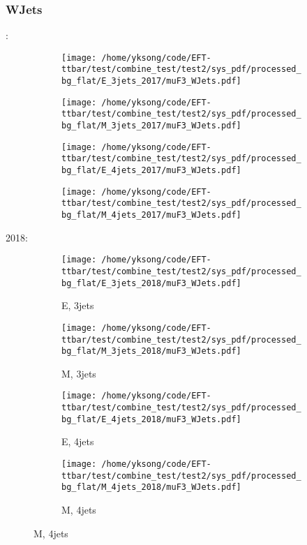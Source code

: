 \documentclass{beamer}
\begin{document}
\begin{frame}
\frametitle{WJets}
\fontsize{5}{1}:
\begin{figure}
\centering
\begin{subfigure}[b]{0.24\textwidth}
\texttt{[image: /home/yksong/code/EFT-ttbar/test/combine\_test/test2/sys\_pdf/processed\_bg\_flat/E\_3jets\_2017/muF3\_WJets.pdf]}
\end{subfigure}
\begin{subfigure}[b]{0.24\textwidth}
\texttt{[image: /home/yksong/code/EFT-ttbar/test/combine\_test/test2/sys\_pdf/processed\_bg\_flat/M\_3jets\_2017/muF3\_WJets.pdf]}
\end{subfigure}
\begin{subfigure}[b]{0.24\textwidth}
\texttt{[image: /home/yksong/code/EFT-ttbar/test/combine\_test/test2/sys\_pdf/processed\_bg\_flat/E\_4jets\_2017/muF3\_WJets.pdf]}
\end{subfigure}
\begin{subfigure}[b]{0.24\textwidth}
\texttt{[image: /home/yksong/code/EFT-ttbar/test/combine\_test/test2/sys\_pdf/processed\_bg\_flat/M\_4jets\_2017/muF3\_WJets.pdf]}
\end{subfigure}
\end{figure}
2018:
\begin{figure}
\centering
\begin{subfigure}[b]{0.24\textwidth}
\texttt{[image: /home/yksong/code/EFT-ttbar/test/combine\_test/test2/sys\_pdf/processed\_bg\_flat/E\_3jets\_2018/muF3\_WJets.pdf]}
\captionsetup{font=tiny}
\caption{E, 3jets}
\end{subfigure}
\begin{subfigure}[b]{0.24\textwidth}
\texttt{[image: /home/yksong/code/EFT-ttbar/test/combine\_test/test2/sys\_pdf/processed\_bg\_flat/M\_3jets\_2018/muF3\_WJets.pdf]}
\captionsetup{font=tiny}
\caption{M, 3jets}
\end{subfigure}
\begin{subfigure}[b]{0.24\textwidth}
\texttt{[image: /home/yksong/code/EFT-ttbar/test/combine\_test/test2/sys\_pdf/processed\_bg\_flat/E\_4jets\_2018/muF3\_WJets.pdf]}
\captionsetup{font=tiny}
\caption{E, 4jets}
\end{subfigure}
\begin{subfigure}[b]{0.24\textwidth}
\texttt{[image: /home/yksong/code/EFT-ttbar/test/combine\_test/test2/sys\_pdf/processed\_bg\_flat/M\_4jets\_2018/muF3\_WJets.pdf]}
\captionsetup{font=tiny}
\caption{M, 4jets}
\end{subfigure}
\end{figure}
\end{frame}
\end{document}
